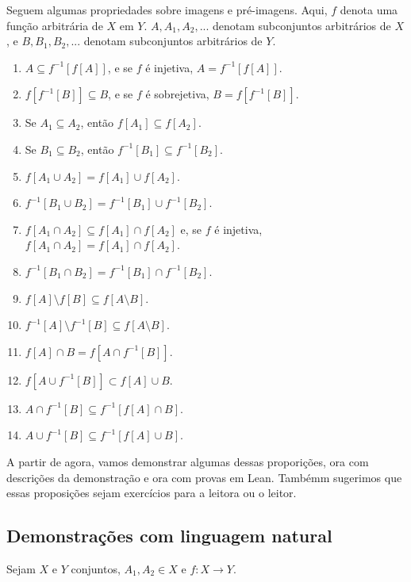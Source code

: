 Seguem algumas propriedades sobre imagens e pré-imagens. Aqui, $f$ denota uma
função arbitrária de $X$ em $Y$. $A, A_1, A_2, ...$ denotam subconjuntos
arbitrários de $X$, e $B, B_1, B_2,...$ denotam subconjuntos arbitrários de
$Y$.

\begin{enumerate}
    \item $A \subseteq f^{-1}[f[A]]$, e se $f$ é injetiva, $A = f^{-1}[f[A]]$.
    \item $f[f^{-1}[B]] \subseteq B$, e se $f$ é sobrejetiva, $B =
    f[f^{-1}[B]]$.
    \item Se $A_1 \subseteq A_2$, então $f[A_1] \subseteq f[A_2]$.
    \item Se $B_1 \subseteq B_2$, então $f^{-1}[B_1] \subseteq f^{-1}[B_2]$.
    \item $f[A_1 \cup A_2] = f[A_1] \cup f[A_2]$.
    \item $f^{-1}[B_1 \cup B_2] = f^{-1}[B_1] \cup f^{-1}[B_2]$.
    \item $f[A_1 \cap A_2] \subseteq f[A_1] \cap f[A_2]$ e, se $f$ é injetiva,
    $f[A_1 \cap A_2] = f[A_1] \cap f[A_2]$.
    \item $f^{-1}[B_1 \cap B_2] = f^{-1}[B_1] \cap f^{-1}[B_2]$.
    \item $f[A] \setminus f[B] \subseteq f[A\setminus B]$.
    \item $f^{-1}[A] \setminus f^{-1}[B] \subseteq f[A \setminus B]$.
    \item $f[A] \cap B = f[A \cap f^{-1}[B]]$.
    \item $f[A \cup f^{-1}[B]] \subset f[A] \cup B $.
    \item $A \cap f^{-1}[B] \subseteq f^{-1}[f[A] \cap B]$.
    \item $A \cup f^{-1}[B] \subseteq f^{-1}[f[A] \cup B]$.
\end{enumerate}

A partir de agora, vamos demonstrar algumas dessas proporições, ora com
descrições da demonstração e ora com provas em Lean. Tambémm sugerimos que
essas proposições sejam exercícios para a leitora ou o leitor.

\subsection{Demonstrações com linguagem natural}

\begin{theorem}[Item 7]
    \label{exerc1}
    Sejam $X$ e $Y$ conjuntos, $A_1, A_2 \in X$ e $f: X \to Y$.
\end{theorem}

